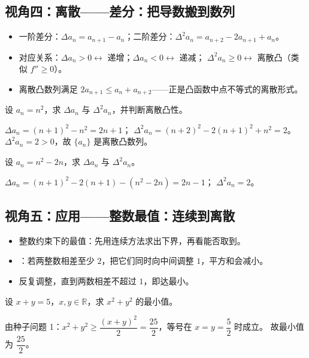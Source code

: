 \begin{explore}
\subsection{视角四：离散——差分：把导数搬到数列}

\begin{itemize}
  \item 一阶差分：$\Delta a_n=a_{n+1}-a_n$；二阶差分：$\Delta^2 a_n=a_{n+2}-2a_{n+1}+a_n$。
  \item 对应关系：$\Delta a_n>0\leftrightarrow$ 递增；$\Delta a_n<0\leftrightarrow$ 递减；
        $\Delta^2 a_n\geq0\leftrightarrow$ 离散凸（类似 $f''\geq0$）。
  \item 离散凸数列满足 $2a_{n+1}\leq a_n+a_{n+2}$——正是凸函数中点不等式的离散形式。
\end{itemize}

\begin{example}
设 $a_n=n^2$，求 $\Delta a_n$ 与 $\Delta^2 a_n$，并判断离散凸性。
\end{example}
\begin{solution}
$\Delta a_n=(n+1)^2-n^2=2n+1$；
$\Delta^2 a_n=(n+2)^2-2(n+1)^2+n^2=2$。
$\Delta^2 a_n=2>0$，故 $\{a_n\}$ 是离散凸数列。
\end{solution}

\begin{problem}
设 $a_n=n^2-2n$，求 $\Delta a_n$ 与 $\Delta^2 a_n$。
\end{problem}
\begin{solution}
$\Delta a_n=(n+1)^2-2(n+1)-(n^2-2n)=2n-1$；
$\Delta^2 a_n=2$。
\end{solution}

\subsection{视角五：应用——整数最值：连续到离散}

\begin{itemize}
  \item 整数约束下的最值：先用连续方法求出下界，再看能否取到。
  \item {}：若两整数相差至少 $2$，把它们同时向中间调整 $1$，平方和会减小。
  \item 反复调整，直到两数相差不超过 $1$，即达最小。
\end{itemize}

\begin{example}
设 $x+y=5$，$x,y\in\mathbb{R}$，求 $x^2+y^2$ 的最小值。
\end{example}
\begin{solution}
由种子问题 1：$x^2+y^2\geq\dfrac{(x+y)^2}{2}=\dfrac{25}{2}$，等号在 $x=y=\dfrac52$ 时成立。
故最小值为 $\dfrac{25}{2}$。
\end{solution}


\end{explore}
